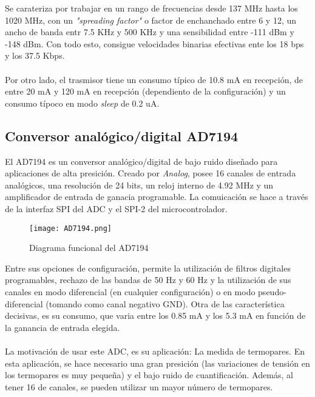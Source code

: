 	
	Se carateriza por trabajar en un rango de frecuencias desde 137 MHz hasta los 1020 MHz, con un \textit{"spreading factor"} o factor de enchanchado entre 6 y 12, un ancho de banda entr 7.5 KHz y 500 KHz y una sensibilidad entre -111 dBm y -148 dBm. Con todo esto, consigue velocidades binarias efectivas ente los 18 bps y los 37.5 Kbps.
	\paragraph{}
	Por otro lado, el trasmisor tiene un consumo típico de 10.8 mA en recepción, de entre 20 mA  y 120 mA en recepción (dependiento de la configuración) y un consumo típoco en modo \textit{sleep} de 0.2 uA.
	
	
	\subsection{Conversor analógico/digital AD7194}
	
	El AD7194 es un conversor analógico/digital de bajo ruido diseñado para aplicaciones de alta presición. Creado por \textit{Analog}, posee 16 canales de entrada analógicos, una resolución de 24 bits, un reloj interno de 4.92 MHz y un amplificador de entrada de ganacia programable. La comuicación se hace a través de la interfaz SPI del ADC y el SPI-2 del microcontrolador.
	
	\begin{figure}[htb!]
		\centering
		\texttt{[image: AD7194.png]}
		\caption{Diagrama funcional del AD7194}
	\end{figure}
	
	Entre sus opciones de configuración, permite la utilización de filtros digitales programables, rechazo de las bandas de 50 Hz y 60 Hz y la utilización de sus canales en modo diferencial (en cualquier configuración) o en modo pseudo-diferencial (tomando como canal negativo GND). Otra de las característica decisivas, es su consumo,  que varia entre los 0.85 mA y los 5.3 mA en función de la ganancia de entrada elegida.
	
	\paragraph{}
	La motivación de usar este ADC, es su aplicación: La medida de termopares. En esta aplicación, se hace necesario una gran presición (las variaciones de tensión en los termopares es muy pequeña) y el bajo ruido de cuantificación. Además, al tener 16 de canales, se pueden utilizar un mayor número de termopares.
	
